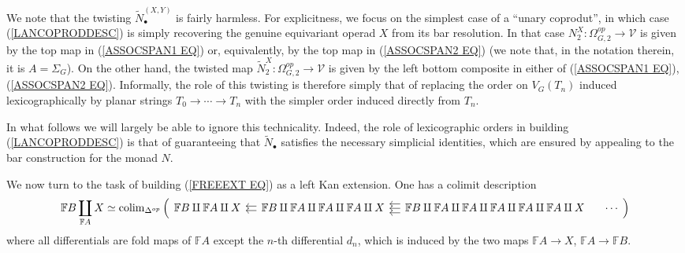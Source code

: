 \documentclass[a4paper,10pt]{article}%
\begin{document}
\begin{remark}
We note that the twisting $\tilde{N}_{\bullet}^{(X,Y)}$ is fairly harmless. 
For explicitness, we focus on the simplest case of a ``unary coprodut'', in which case (\ref{LANCOPRODDESC})
is simply recovering the genuine equivariant operad $X$ from its bar resolution. 
In that case $N^X_2 \colon \Omega_{G,2}^{op} \to \mathcal{V}$
is given by the top map in 
(\ref{ASSOCSPAN1 EQ}) or, equivalently, by the top map in 
(\ref{ASSOCSPAN2 EQ}) (we note that, in the notation therein, it is $A=\Sigma_G$). On the other hand, the twisted map
$\tilde{N}^X_2 \colon \Omega_{G,2}^{op} \to \mathcal{V}$
is given by the left bottom composite in either of (\ref{ASSOCSPAN1 EQ}), (\ref{ASSOCSPAN2 EQ}).
Informally, the role of this twisting is therefore simply that of replacing the order on $V_G(T_n)$ induced lexicographically by planar strings 
$T_0 \to \cdots \to T_n$
with the simpler order induced directly from $T_n$.

In what follows we will largely be able to ignore this technicality. Indeed, the role of lexicographic orders
in building (\ref{LANCOPRODDESC}) is that of guaranteeing that 
$\tilde{N}_{\bullet}$ satisfies the necessary simplicial identities, which are ensured by appealing to the bar construction for the monad $N$.
\end{remark}


We now turn to the task of building (\ref{FREEEXT EQ})
as a left Kan extension. One has a colimit description
\begin{equation}\label{FREEEXTUSEFCOL EQ}
	\mathbb{F} B \coprod_{\mathbb{F} A} X
\simeq
	\colim_{\Delta^{op}} \left(
\begin{tikzcd}[column sep = 1em]
	\mathbb{F} B \amalg \mathbb{F} A \amalg X &
	\mathbb{F} B \amalg \mathbb{F} A \amalg \mathbb{F} A \amalg \mathbb{F} A  \amalg X
	\ar[l,shift left=2pt] \ar[l,shift left=-2pt] &	
	\mathbb{F} B \amalg \mathbb{F} A \amalg \mathbb{F} A \amalg \mathbb{F} A \amalg \mathbb{F} A \amalg \mathbb{F} A  \amalg X
	\ar[l,shift left=4pt] \ar[l,shift left=-4pt]  \ar[l] &
	\cdots
\end{tikzcd}
	\right)
\end{equation}
where all differentials are fold maps of $\mathbb{F} A$ except the $n$-th differential $d_n$, which is induced by the two maps $\mathbb{F}A \to X$, $\mathbb{F}A \to \mathbb{F}B$.
\end{document}
